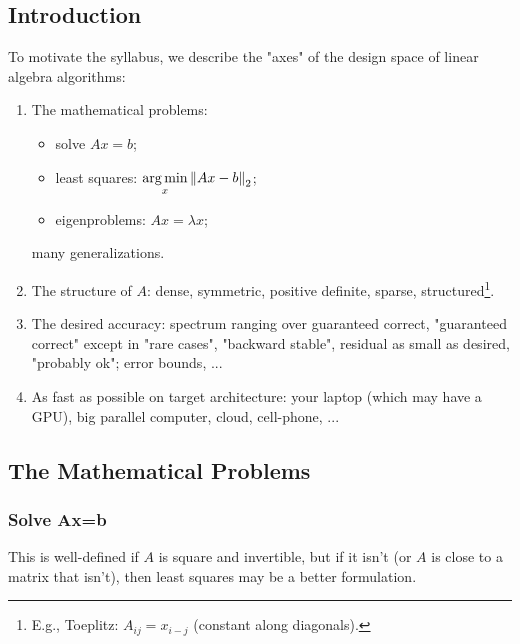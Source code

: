 \documentclass[11pt]{article}
\numberwithin{equation}{section}
\begin{document}
\subsection{Introduction}
To motivate the syllabus, we describe the "axes" of the design space of linear algebra algorithms:\begin{enumerate}
    \item The mathematical problems:\begin{itemize}
        \item solve $Ax=b$;
        \item least squares: $\underset{x}{\arg \min}\left\| Ax-b \right\|_2$;
        \item eigenproblems: $Ax = \lambda x$;
    \end{itemize} 
    many generalizations.
    \item The structure of $A$: dense, symmetric, positive definite, sparse, structured\footnote{E.g., Toeplitz: $A_{ij} = x_{i-j}$ (constant along diagonals).}.
    \item The desired accuracy: spectrum ranging over guaranteed correct, "guaranteed correct" except in "rare cases", "backward stable", 
    residual as small as desired, "probably ok"; error bounds, ...
    \item As fast as possible on target architecture: your laptop (which may have a GPU), big parallel computer, cloud, cell-phone, ...
\end{enumerate}

\subsection{The Mathematical Problems}
\subsubsection{Solve Ax=b}
This is well-defined if $A$ is square and invertible, but if it isn't (or $A$ is close to a matrix that isn't), then least squares may be a better formulation.
 
\end{document}
